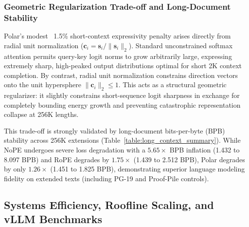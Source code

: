 \documentclass{article} %
\begin{document}
\subsubsection{Geometric Regularization Trade-off and Long-Document Stability}
Polar's modest ~1.5\% short-context expressivity penalty arises directly from radial unit normalization ($\mathbf{c}_i = \mathbf{s}_i / \|\mathbf{s}_i\|_2$). Standard unconstrained softmax attention permits query-key logit norms to grow arbitrarily large, expressing extremely sharp, high-peaked output distributions optimal for short 2K context completion. By contrast, radial unit normalization constrains direction vectors onto the unit hypersphere $\|\mathbf{c}_i\|_2 \le 1$. This acts as a structural geometric regularizer: it slightly constrains short-sequence logit sharpness in exchange for completely bounding energy growth and preventing catastrophic representation collapse at 256K lengths.

This trade-off is strongly validated by long-document bits-per-byte (BPB) stability across 256K extensions (Table~\ref{table:long_context_summary}). While NoPE undergoes severe loss degradation with a $5.65\times$ BPB inflation (1.432 to 8.097 BPB) and RoPE degrades by $1.75\times$ (1.439 to 2.512 BPB), Polar degrades by only $1.26\times$ (1.451 to 1.825 BPB), demonstrating superior language modeling fidelity on extended texts (including PG-19 and Proof-Pile controls).

\FloatBarrier
\subsection{Systems Efficiency, Roofline Scaling, and vLLM Benchmarks}
\end{document}
